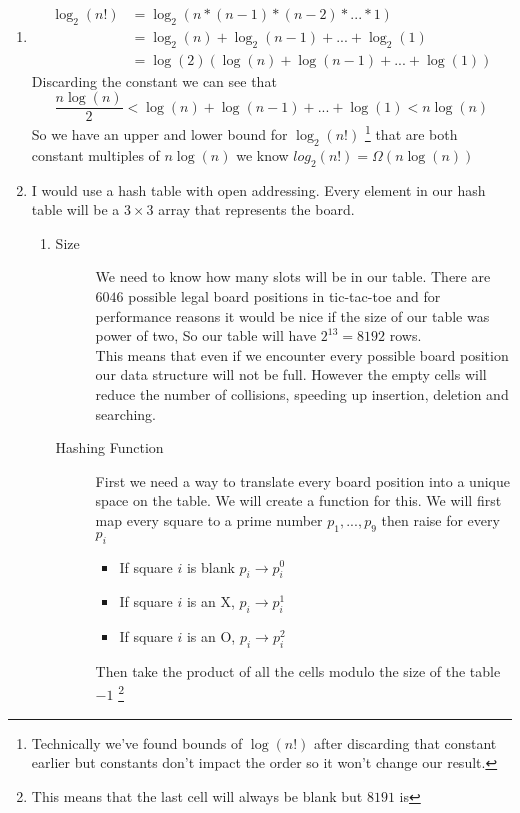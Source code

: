 \documentclass[11pt]{article}
\begin{document}
\begin{enumerate}
	\item
		\begin{align*}
			\log_2(n!) & = \log_2(n * (n - 1) * (n - 2) * ... * 1)\\
			& = \log_2(n) + \log_2(n-1) + ... + \log_2(1)\\
			& = \log(2) (\log(n) + \log(n-1) + ... + \log(1))
		\end{align*}
		Discarding the constant we can see that
		$$ \frac{n\log(n)}{2} < \log(n) + \log(n-1) + ... + \log(1) <
		n\log(n)$$ 
		So we have an upper and lower bound for $\log_2(n!)$
		\footnote{Technically we've found bounds of $\log(n!)$ after discarding that
		constant earlier but constants don't impact the order so it
		won't change our result.}
		that are both constant multiples of $ n \log(n) $ we know
		$log_2(n!) =  \Omega(n \log(n))$
	\item
		I would use a hash table with open addressing. Every element in
		our hash table will be a $3 \times 3$ array that represents the
		board.
		\begin{enumerate}
		\item
		\begin{description}
		\item[Size] We need to know how many slots will be in our
			table. There are $6046$ possible legal board positions
			in tic-tac-toe and for performance reasons it would be nice if the
			size of our table was power of two, So our table will
			have $2^{13} = 8192$ rows. \\
			This means that even if we encounter every possible board
			position our data structure will not be full. However the
			empty cells will reduce the number of collisions,
			speeding up insertion, deletion and searching.
		\item[Hashing Function] First we need a way to translate every
			board position into a unique space on the table. We will
			create a function for this. We will first map every 
			square to a prime number $p_1,...,p_9$ then raise for
			every $p_i$
			\begin{itemize}
				\item If square $i$ is blank $p_i \rightarrow p_i^0$
				\item If square $i$ is an X, $p_i \rightarrow p_i^1$
				\item If square $i$ is an O, $p_i \rightarrow p_i^2$
		\end{itemize}
			Then take the product of all the cells modulo the size
				of the table $-1$ \footnote{This means that the
				last cell will always be blank but $8191$ is
}
\end{description}
\end{enumerate}
\end{enumerate}
\end{document}
